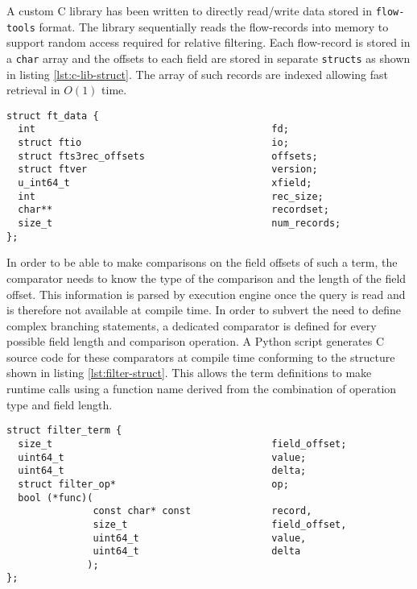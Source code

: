 A custom C library has been written to directly read/write data stored in
\texttt{flow-tools} format. The library sequentially reads the flow-records
into memory to support random access required for relative filtering. Each
flow-record is stored in a \texttt{char} array and the offsets to each field
are stored in separate \texttt{structs} as shown in listing
\ref{lst:c-lib-struct}. The array of such records are indexed allowing fast
retrieval in $O(1)$ time.

\begin{lstlisting}
struct ft_data {
  int                                         fd;
  struct ftio                                 io;
  struct fts3rec_offsets                      offsets;
  struct ftver                                version;
  u_int64_t                                   xfield;
  int                                         rec_size;
  char**                                      recordset;
  size_t                                      num_records;
};
\end{lstlisting}

In order to be able to make comparisons on the field offsets of such a term,
the comparator needs to know the type of the comparison and the length of the
field offset. This information is parsed by execution engine once the query is
read and is therefore not available at compile time.  In order to subvert the
need to define complex branching statements, a dedicated comparator is defined
for every possible field length and comparison operation. A Python script
generates C source code for these comparators at compile time conforming to
the structure shown in listing \ref{lst:filter-struct}. This allows the term
definitions to make runtime calls using a function name derived from the
combination of operation type and field length.

\begin{lstlisting}
struct filter_term {
  size_t                                      field_offset;
  uint64_t                                    value;
  uint64_t                                    delta;
  struct filter_op*                           op;
  bool (*func)(
               const char* const              record,
               size_t                         field_offset,
               uint64_t                       value,
               uint64_t                       delta
              );
};
\end{lstlisting}

